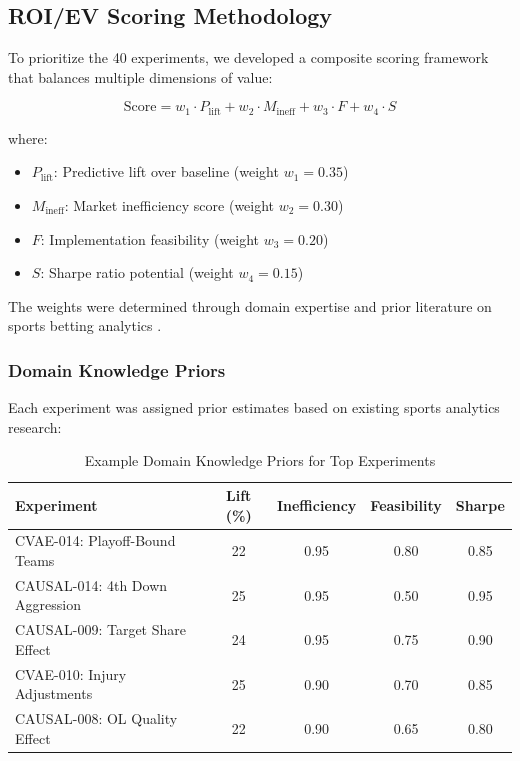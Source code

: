 \subsection{ROI/EV Scoring Methodology}

To prioritize the 40 experiments, we developed a composite scoring framework that balances multiple dimensions of value:

\begin{equation}
\text{Score} = w_1 \cdot P_{\text{lift}} + w_2 \cdot M_{\text{ineff}} + w_3 \cdot F + w_4 \cdot S
\label{eq:roi_score}
\end{equation}

where:
\begin{itemize}
    \item $P_{\text{lift}}$: Predictive lift over baseline (weight $w_1 = 0.35$)
    \item $M_{\text{ineff}}$: Market inefficiency score (weight $w_2 = 0.30$)
    \item $F$: Implementation feasibility (weight $w_3 = 0.20$)
    \item $S$: Sharpe ratio potential (weight $w_4 = 0.15$)
\end{itemize}

The weights were determined through domain expertise and prior literature on sports betting analytics \citep{kovalchik2016searching, brown2019applying}.

\subsubsection{Domain Knowledge Priors}

Each experiment was assigned prior estimates based on existing sports analytics research:

\begin{table}[htbp]
\centering
\caption{Example Domain Knowledge Priors for Top Experiments}
\label{tab:experiment_priors}
\small
\begin{tabular}{lcccc}
\toprule
\textbf{Experiment} & \textbf{Lift (\%)} & \textbf{Inefficiency} & \textbf{Feasibility} & \textbf{Sharpe} \\
\midrule
CVAE-014: Playoff-Bound Teams & 22 & 0.95 & 0.80 & 0.85 \\
CAUSAL-014: 4th Down Aggression & 25 & 0.95 & 0.50 & 0.95 \\
CAUSAL-009: Target Share Effect & 24 & 0.95 & 0.75 & 0.90 \\
CVAE-010: Injury Adjustments & 25 & 0.90 & 0.70 & 0.85 \\
CAUSAL-008: OL Quality Effect & 22 & 0.90 & 0.65 & 0.80 \\
\bottomrule
\end{tabular}
\end{table}

